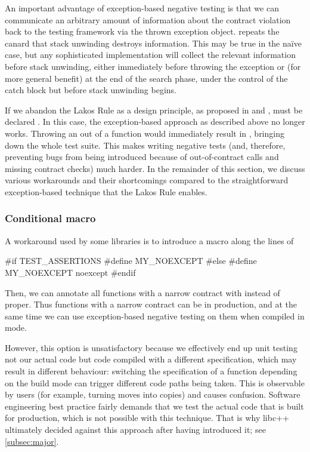 An important advantage of exception-based negative testing is that we can communicate an arbitrary amount of information about the contract violation back to the testing framework via the thrown exception object. \cite{P1656R2} repeats the canard that stack unwinding destroys information. This may be true in the na\" ive case, but any sophisticated implementation will collect the relevant information before stack unwinding, either immediately before throwing the exception or (for more general benefit) at the end of the search phase, under the control of the catch block but before stack unwinding begins.

If we abandon the Lakos Rule as a design principle, as proposed in \cite{P1656R2} and \cite{P2148R0},  must be declared . In this case, the exception-based approach as described above no longer works. Throwing an  out of a  function would immediately result in , bringing down the whole test suite. This makes writing negative tests (and, therefore, preventing bugs from being introduced because of out-of-contract calls and missing contract checks) much harder. In the remainder of this section, we discuss various workarounds and their shortcomings compared to the straightforward exception-based technique that the Lakos Rule enables.

\subsubsection{Conditional  macro}
\label{subsubsec:conditional}

A workaround used by some libraries is to introduce a macro along the lines of
\begin{codeblock}
#if TEST_ASSERTIONS
  #define MY_NOEXCEPT 
#else
  #define MY_NOEXCEPT noexcept
#endif
\end{codeblock}
Then, we can annotate all functions with a narrow contract with  instead of  proper. Thus functions with a narrow contract can be  in production, and at the same time we can use exception-based negative testing on them when compiled in \mbox{} mode.

However, this option is  unsatisfactory because we effectively end up unit testing not our actual code but code compiled with a different specification, which may result in different behaviour: switching the  specification of a function depending on the build mode can trigger different code paths being taken. This is observable by users (for example, turning moves into copies) and causes confusion. Software engineering best practice fairly demands that we test the actual code that is built for production, which is not possible with this technique. That is why libc++ ultimately decided against this approach after having introduced it; see \ref{subsec:major}.

